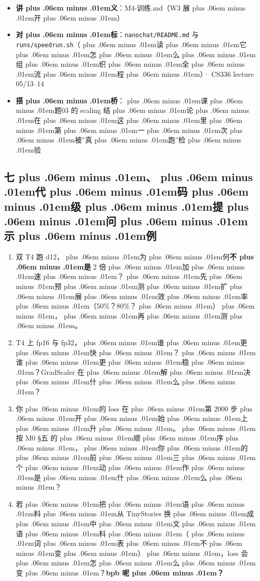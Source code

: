 \documentclass[
]{article}
\newcommand{\passthrough}[1]{#1}
\providecommand{\tightlist}{%
  \setlength{\itemsep}{0pt}\setlength{\parskip}{0pt}}
\def\zh#1{{\zhfont #1}}
\def\sym#1{{\symfont #1}}
\def\codezh#1{{\zhmonofont #1}}
\def\zhglue{\hskip0pt plus .06em minus .01em}
\begin{document}
\begin{itemize}
\tightlist
\item
  \textbf{\zh{讲\zhglue 义}}\zh{：}\passthrough{\codezh{M4-{\zh{训}}{\zh{练}}.md}}\zh{（}W3 \zh{展\zhglue 开\zhglue ）}
\item
  \textbf{\zh{对\zhglue 标}}\zh{：}\passthrough{\lstinline!nanochat/README.md!} \zh{与} \passthrough{\lstinline!runs/speedrun.sh!}\zh{（\zhglue 读\zhglue 它\zhglue 怎\zhglue 么\zhglue 组\zhglue 织\zhglue 全\zhglue 流\zhglue 程\zhglue ）}\sym{·} CS336 lecture 05/13--14
\item
  \textbf{\zh{搭\zhglue 桥}}\zh{：\zhglue 课\zhglue 题}03 \zh{的} scaling \zh{结\zhglue 论\zhglue 在\zhglue 这\zhglue 里\zhglue 第\zhglue 一\zhglue 次\zhglue 被}''\zh{真\zhglue 跑}''\zh{检\zhglue 验}
\end{itemize}

\subsection{\zh{七\zhglue 、\zhglue 代\zhglue 码\zhglue 级\zhglue 提\zhglue 问\zhglue 示\zhglue 例}}\label{ux4e03ux4ee3ux7801ux7ea7ux63d0ux95eeux793aux4f8b-1}

\begin{enumerate}
\def\labelenumi{\arabic{enumi}.}
\tightlist
\item
  \zh{双} T4 \zh{跑} d12\zh{，\zhglue 为\zhglue 何}\textbf{\zh{不\zhglue 是}} 2 \zh{倍\zhglue 加\zhglue 速\zhglue ？\zhglue 先\zhglue 预\zhglue 测\zhglue 扩\zhglue 展\zhglue 效\zhglue 率\zhglue （}50\%\zh{？}80\%\zh{？\zhglue ）\zhglue ，\zhglue 再\zhglue 测\zhglue 。}
\item
  T4 \zh{上} fp16 \zh{与} fp32\zh{，\zhglue 谁\zhglue 更\zhglue 快\zhglue ？\zhglue 谁\zhglue 更\zhglue 稳\zhglue ？}GradScaler \zh{在\zhglue 解\zhglue 决\zhglue 什\zhglue 么\zhglue ？}
\item
  \zh{你\zhglue 的} loss \zh{在\zhglue 第} 2000 \zh{步\zhglue 开\zhglue 始\zhglue 上\zhglue 升\zhglue 。\zhglue 按} M0 \sym{§}\zh{五} \zh{的\zhglue 顺\zhglue 序\zhglue ，\zhglue 你\zhglue 的\zhglue 前\zhglue 三\zhglue 个\zhglue 动\zhglue 作\zhglue 是\zhglue 什\zhglue 么\zhglue ？}
\item
  \zh{若\zhglue 把\zhglue 语\zhglue 料\zhglue 从} TinyStories \zh{换\zhglue 成\zhglue 中\zhglue 文\zhglue 语\zhglue 料\zhglue （\zhglue 词\zhglue 表\zhglue 不\zhglue 变\zhglue ）\zhglue ，}loss \zh{会\zhglue 怎\zhglue 么\zhglue 变\zhglue ？}\textbf{bpb \zh{呢\zhglue ？}}
\end{enumerate}
\end{document}
